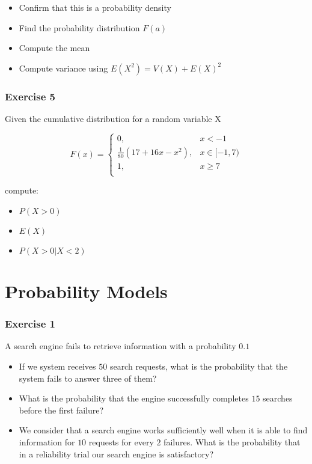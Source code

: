 \documentclass[
]{book}
\providecommand{\tightlist}{%
  \setlength{\itemsep}{0pt}\setlength{\parskip}{0pt}}
\begin{document}
\begin{itemize}
\tightlist
\item
  Confirm that this is a probability density
\item
  Find the probability distribution \(F(a)\)
\item
  Compute the mean
\item
  Compute variance using \(E(X^2)=V(X)+E(X)^2\)
\end{itemize}

\hypertarget{exercise-5-1}{%
\subsubsection{Exercise 5}\label{exercise-5-1}}

Given the cumulative distribution for a random variable X

\[
    F(x)= 
\begin{cases}
0, & x  < -1 \\
\frac{1}{80}(17+16x-x^2),& x \in [-1,7)\\
1,& x \geq 7\\
\end{cases}
\]

compute:

\begin{itemize}
\tightlist
\item
  \(P(X>0)\)
\item
  \(E(X)\)
\item
  \(P(X>0|X<2)\)
\end{itemize}

\hypertarget{probability-models}{%
\section{Probability Models}\label{probability-models}}

\hypertarget{exercise-1-4}{%
\subsubsection{Exercise 1}\label{exercise-1-4}}

A search engine fails to retrieve information with a probability \(0.1\)

\begin{itemize}
\item
  If we system receives \(50\) search requests, what is the probability that the system fails to answer three of them?
\item
  What is the probability that the engine successfully completes \(15\) searches before the first failure?
\item
  We consider that a search engine works sufficiently well when it is able to find information for \(10\) requests for every \(2\) failures. What is the probability that in a reliability trial our search engine is satisfactory?
\end{itemize}
\end{document}
